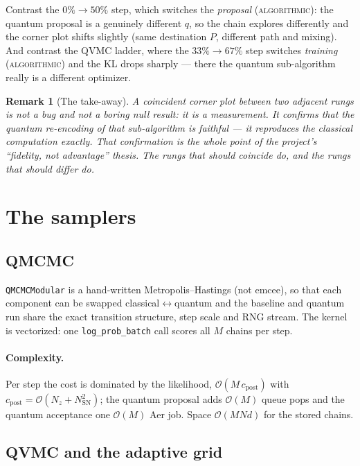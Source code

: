 \documentclass[11pt]{article}
\newtheorem{remark}{Remark}[section]
\newcommand{\code}[1]{\texttt{#1}}
\newcommand{\bigO}{\mathcal{O}}
\newcommand{\algorithmic}{\textsc{algorithmic}}
\begin{document}
Contrast the $0\%\!\to\!50\%$ step, which switches the \emph{proposal}
(\algorithmic): the quantum proposal is a genuinely different $q$, so the chain
explores differently and the corner plot shifts slightly (same destination $P$,
different path and mixing). And contrast the QVMC ladder, where the
$33\%\!\to\!67\%$ step switches \emph{training} (\algorithmic) and the KL drops
sharply --- there the quantum sub-algorithm really is a different optimizer.

\begin{remark}[The take-away]
A coincident corner plot between two adjacent rungs is not a bug and not a
boring null result: it is a \emph{measurement}. It confirms that the quantum
re-encoding of that sub-algorithm is faithful --- it reproduces the classical
computation exactly. That confirmation is the whole point of the project's
``fidelity, not advantage'' thesis. The rungs that \emph{should} coincide do,
and the rungs that \emph{should} differ do.
\end{remark}


\section{The samplers}

\subsection{QMCMC}
\label{sec:qmcmc}

\code{QMCMCModular} is a hand-written Metropolis--Hastings (not emcee), so that
each component can be swapped classical$\leftrightarrow$quantum and the
baseline and quantum run share the exact transition structure, step scale and
RNG stream. The kernel is vectorized: one \code{log\_prob\_batch} call scores
all $M$ chains per step.

\paragraph{Complexity.}
Per step the cost is dominated by the likelihood, $\bigO(M\,c_{\mathrm{post}})$
with $c_{\mathrm{post}}=\bigO(N_z+N_{\mathrm{SN}}^2)$; the quantum proposal
adds $\bigO(M)$ queue pops and the quantum acceptance one $\bigO(M)$ Aer job.
Space $\bigO(MNd)$ for the stored chains.

\subsection{QVMC and the adaptive grid}
\label{sec:qvmc}
\end{document}
